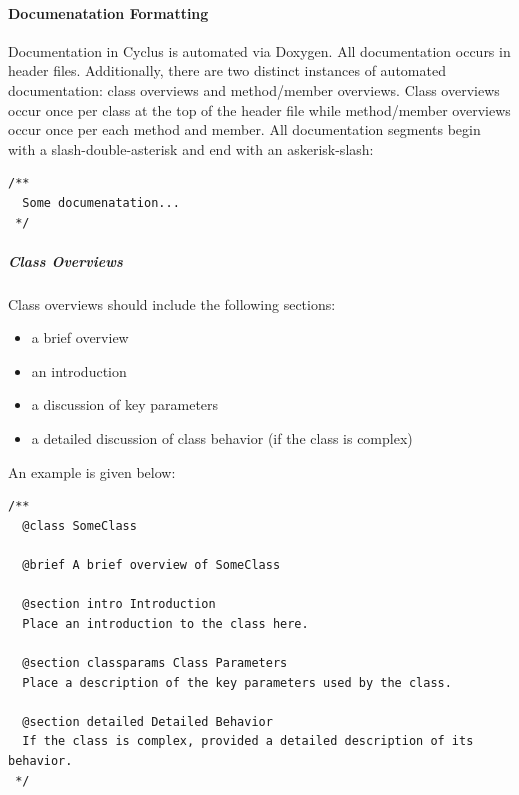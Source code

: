 \documentclass[letterpaper,10pt,english]{sphinxmanual}
\begin{document}
\paragraph{Documenatation Formatting}
\label{devdoc/style_guide:documenatation-formatting}\label{devdoc/style_guide:google-style-guide}
Documentation in Cyclus is automated via Doxygen. All documentation occurs in header files.
Additionally, there are two distinct instances of automated documentation: class overviews
and method/member overviews. Class overviews occur once per class at the top of the header file
while method/member overviews occur once per each method and member. All documentation
segments begin with a slash-double-asterisk and end with an askerisk-slash:

\begin{Verbatim}[commandchars=\\\{\}]
/**
  Some documenatation...
 */
\end{Verbatim}


\subparagraph{Class Overviews}
\label{devdoc/style_guide:class-overviews}
Class overviews should include the following sections:
\begin{itemize}
\item {} 
a brief overview

\item {} 
an introduction

\item {} 
a discussion of key parameters

\item {} 
a detailed discussion of class behavior (if the class is complex)

\end{itemize}

An example is given below:

\begin{Verbatim}[commandchars=\\\{\}]
/**
  @class SomeClass

  @brief A brief overview of SomeClass

  @section intro Introduction
  Place an introduction to the class here.

  @section classparams Class Parameters
  Place a description of the key parameters used by the class.

  @section detailed Detailed Behavior
  If the class is complex, provided a detailed description of its behavior.
 */
\end{Verbatim}
\end{document}
